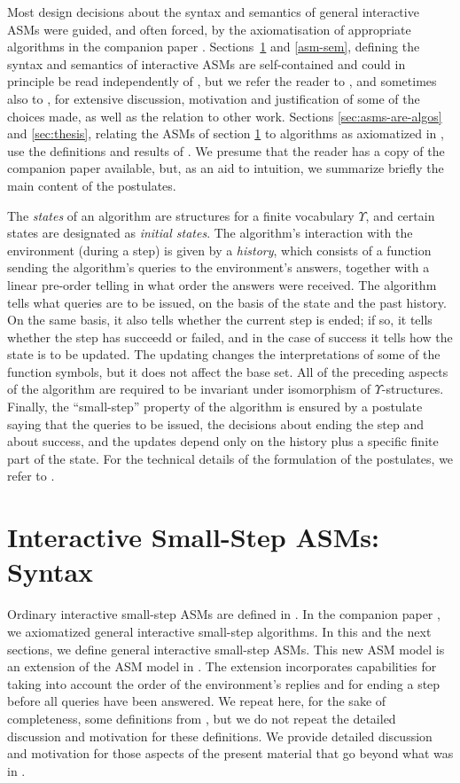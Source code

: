 \documentclass{LMCS}
\theoremstyle{definition}
\begin{document}
Most design decisions about the syntax and semantics of general
interactive ASMs were guided, and often forced, by the axiomatisation
of appropriate algorithms in the companion paper \cite{ga1}.
Sections~\ref{sec:asm} and \ref{asm-sem}, defining the syntax and semantics of
interactive ASMs are self-contained and could in principle be read
independently of \cite{ga1}, but we refer the reader to \cite{ga1},
and sometimes also to \cite{oa1,oa2,oa3}, for extensive discussion,
motivation and justification of some of the choices made, as well as
the relation to other work.  Sections \ref{sec:asms-are-algos} and
\ref{sec:thesis}, relating the ASMs of section \ref{sec:asm} to
algorithms as axiomatized in \cite{ga1}, use the definitions and
results of \cite{ga1}.  We presume that the reader has a copy of the
companion paper \cite{ga1} available, but, as an aid to intuition, we
summarize briefly the main content of the postulates.

The \emph{states} of an algorithm are structures for a finite
vocabulary $\Upsilon$, and certain states are designated as
\emph{initial states}.  The algorithm's interaction with the
environment (during a step) is given by a \emph{history}, which
consists of a function sending the algorithm's queries to the
environment's answers, together with a linear pre-order telling in
what order the answers were received.  The algorithm tells what
queries are to be issued, on the basis of the state and the past
history.  On the same basis, it also tells whether the current step is
ended; if so, it tells whether the step has succeedd or failed, and in
the case of success it tells how the state is to be updated.  The
updating changes the interpretations of some of the function symbols,
but it does not affect the base set.  All of the preceding aspects of
the algorithm are required to be invariant under isomorphism of
$\Upsilon$-structures.  Finally, the ``small-step'' property of the
algorithm is ensured by a postulate saying that the queries to be
issued, the decisions about ending the step and about success, and the
updates depend only on the history plus a specific finite part of the
state.  For the technical details of the formulation of the
postulates, we refer to \cite[Section~3]{ga1}.

\section{Interactive Small-Step ASMs: Syntax}   \label{sec:asm}

Ordinary interactive small-step ASMs are defined in \cite{oa2}.  In the
companion paper \cite{ga1}, we axiomatized general interactive
small-step algorithms.  In this and the next sections, we define general
interactive small-step ASMs.  This new ASM model is an extension of the
ASM model in \cite{oa2}.  The extension incorporates capabilities for
taking into account the order of the environment's replies and for ending
a step before all queries have been answered.  We repeat here, for the
sake of completeness, some definitions from \cite{oa2,ga1}, but we do not
repeat the detailed discussion and motivation for these definitions.  We
provide detailed discussion and motivation for those aspects of the
present material that go beyond what was in \cite{oa2,ga1}.
\end{document}
